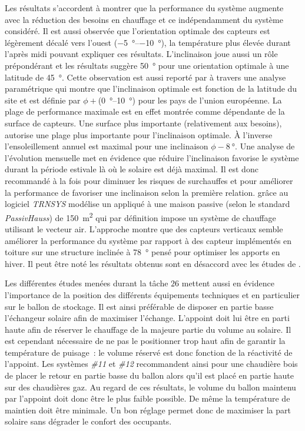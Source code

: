 Les résultats s’accordent à montrer que la performance du système augmente avec la réduction des
besoins en chauffage et ce indépendamment du système considéré.
Il est aussi observée que l’orientation optimale des capteurs est légèrement décalé vers
l’ouest (\SIrange{-5}{-10}{\degree}), la température plus élevée durant l’après midi pouvant
expliquer ces résultats.
L’inclinaison joue aussi un rôle prépondérant et les résultats suggère \SI{50}{\degree}
pour une orientation optimale à une latitude de \SI{45}{\degree}. Cette observation est
aussi reporté par \textcite{Shariah2002587} à travers une analyse paramétrique qui montre
que l’inclinaison optimale est fonction de la latitude du site et est définie par
$\phi + $(\SIrange{0}{10}{\degree}) pour les pays de l’union européenne. La plage de performance
maximale est en effet montrée comme dépendante de la surface de capteurs.
Une surface plus importante (relativement aux besoins), autorise une plage plus importante
pour l’inclinaison optimale. À l’inverse l’ensoleillement annuel est maximal pour
une inclinaison $\phi - \SI{8}{\degree}$. Une analyse de l’évolution mensuelle met
en évidence que réduire l’inclinaison favorise le système durant la période estivale
là où le solaire est déjà maximal. Il est donc recommandé à la fois pour diminuer
les risques de surchauffes et pour améliorer la performance de favoriser une
inclinaison selon la première relation.
\textcite{Badescu2006129} grâce au logiciel \textit{TRNSYS} modélise un 
appliqué à une maison passive (selon le standard \textit{PassivHauss}) de \SI{150}{\metre\squared}
qui par définition impose un système de chauffage utilisant le vecteur air. L’approche montre que des
capteurs verticaux semble améliorer la performance du système par rapport à des
capteur implémentés en toiture sur une structure inclinée à \SI{78}{\degree} pensé pour optimiser les apports
en hiver. Il peut être noté les résultats obtenus sont en désaccord avec les études
de \textcite{Task26C2007,Shariah2002587}.

Les différentes études menées durant la tâche $26$ mettent aussi en évidence l’importance
de la position des différents équipements techniques et en particulier sur le ballon
de stockage. Il est ainsi préférable de disposer en partie basse l’échangeur solaire
afin de maximiser l’échange. L’appoint doit lui être en parti haute afin de réserver
le chauffage de la majeure partie du volume au solaire. Il est cependant nécessaire
de ne pas le positionner trop haut afin de garantir la température de puisage~: le volume
réservé est donc fonction de la réactivité de l’appoint. Les systèmes \emph{\#11} et
\emph{\#12} recommandent ainsi pour une chaudière bois de placer le retour en partie
basse du ballon alors qu’il est placé en partie haute sur des chaudières gaz.
Au regard de ces résultats, le volume du ballon maintenu par l’appoint doit donc
être le plus faible possible. De même la température de maintien doit être minimale.
Un bon réglage permet donc de maximiser la part solaire sans dégrader le confort des occupants.

